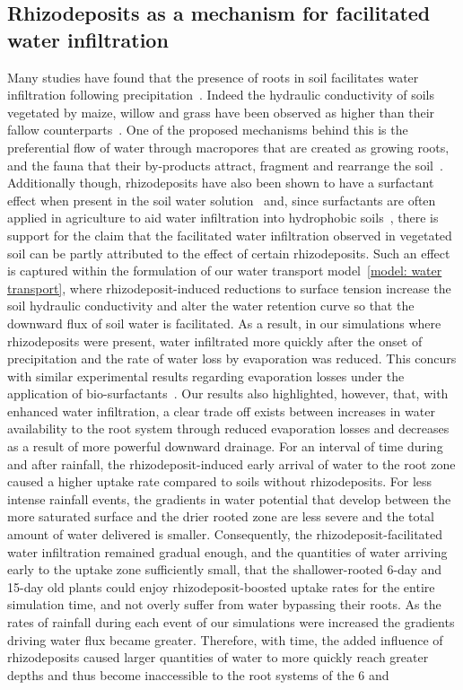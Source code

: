 \documentclass[11pt,a4paper]{article}
\numberwithin{equation}{section}
\begin{document}
\subsection{Rhizodeposits as a mechanism for facilitated water infiltration}
Many studies have found that the presence of roots in soil facilitates water infiltration following precipitation~\citep{cerda1999parent,marshall2014impact,wu2016mixed}. Indeed the hydraulic conductivity of soils vegetated by maize, willow and grass have been observed as higher than their fallow counterparts~\citep{feki2018influence, leung2018plant}. One of the proposed mechanisms behind this is the preferential flow of water through macropores that are created as growing roots, and the fauna that their by-products attract, fragment and rearrange the soil~\citep{angers1998plant,luo2019roots}. Additionally though, rhizodeposits have also been shown to have a surfactant effect when present in the soil water solution~\citep{read1997surface, read2003plant, naveed2019surface} and, since surfactants are often applied in agriculture to aid water infiltration into hydrophobic soils~\citep{ogunmokun2020influence}, there is support for the claim that the facilitated water infiltration observed in vegetated soil can be partly attributed to the effect of certain rhizodeposits. Such an effect is captured within the formulation of our water transport model~\eqref{model: water transport}, where rhizodeposit-induced reductions to surface tension increase the soil hydraulic conductivity and alter the water retention curve so that the downward flux of soil water is facilitated. As a result, in our simulations where rhizodeposits were present, water infiltrated more quickly after the onset of precipitation and the rate of water loss by evaporation was reduced. This concurs with similar experimental results regarding evaporation losses under the application of bio-surfactants~\citep{gutierrez2022investigating}. Our results also highlighted, however, that, with enhanced water infiltration, a clear trade off exists between increases in water availability to the root system through reduced evaporation losses and decreases as a result of more powerful downward drainage. For an interval of time during and after rainfall, the rhizodeposit-induced early arrival of water to the root zone caused a higher uptake rate compared to soils without rhizodeposits. For less intense rainfall events, the gradients in water potential that develop between the more saturated surface and the drier rooted zone are less severe and the total amount of water delivered is smaller. Consequently, the rhizodeposit-facilitated water infiltration remained gradual enough, and the quantities of water arriving early to the uptake zone sufficiently small, that the shallower-rooted 6-day and 15-day old plants could enjoy rhizodeposit-boosted uptake rates for the entire simulation time, and not overly suffer from water bypassing their roots. As the rates of rainfall during each event of our simulations were increased the gradients driving  water flux became greater. Therefore, with time, the added influence of rhizodeposits caused larger quantities of water to more quickly reach greater depths and thus become inaccessible to the root systems of the 6 and 
\end{document}
